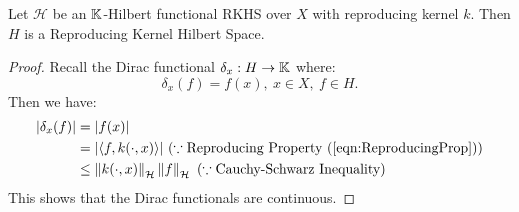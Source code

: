\documentclass[english]{article}
\newcommand\norm[1]{\left\lVert#1\right\rVert}
\newcommand\inner[1]{\langle#1\rangle}
\begin{document}
\begin{lem}
	Let $\mathcal{H}$ be an $\mathbb{K}$-Hilbert functional RKHS over $X$ with reproducing kernel $k$. Then $H$ is a Reproducing Kernel Hilbert Space.
\end{lem}
\begin{proof}
	Recall the Dirac functional $\delta_x: H \rightarrow \mathbb{K}$ where:
	\[ \delta_x(f) = f(x), ~ x \in X, ~ f \in H. \]
	Then we have:
	\begin{equation*}
	\begin{split}
		|\delta_x(f)| &= |f(x)| \\
			&= |\inner{f, k(\cdot, x)}| ~ (\because \text{Reproducing Property }(\ref{eqn:ReproducingProp})) \\
			&\leq \norm{k(\cdot, x)}_\mathcal{H} \norm{f}_
			\mathcal{H} ~ (\because \text{Cauchy-Schwarz Inequality}) \\
	\end{split}
	\end{equation*}
	This shows that the Dirac functionals are continuous.
\end{proof}
\end{document}
